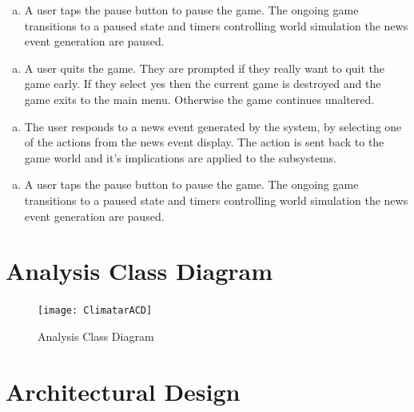 \documentclass[]{article}
\begin{document}
\begin{enumerate}[d)]
	\item A user taps the pause button to pause the game. The ongoing game transitions to a paused state and timers controlling world simulation the news event generation are paused.
\end{enumerate}

\begin{enumerate}[e)]
	\item A user quits the game. They are prompted if they really want to quit the game early. If they select yes then the current game is destroyed and the game exits to the main menu. Otherwise the game continues unaltered.
\end{enumerate}

\begin{enumerate}[f)]
	\item The user responds to a news event generated by the system, by selecting one of the actions from the news event display. The action is sent back to the game world and it's implications are applied to the subsystems.
\end{enumerate}

\begin{enumerate}[g)]
	\item A user taps the pause button to pause the game. The ongoing game transitions to a paused state and timers controlling world simulation the news event generation are paused.
\end{enumerate}


\section{Analysis Class Diagram}
\label{sec:analysis_class_diagram}

\begin{figure}[ht!]
\centering
\texttt{[image: ClimatarACD]}
\caption{Analysis Class Diagram\label{acd}}
\end{figure}



\section{Architectural Design}
\label{sec:architectural_design}
\end{document}
